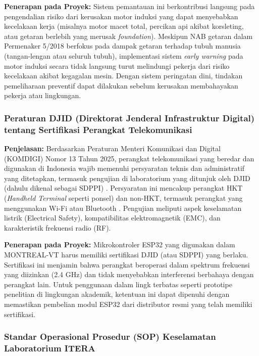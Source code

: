 \documentclass{elsinta}
\begin{document}
\textbf{Penerapan pada Proyek:} Sistem pemantauan ini berkontribusi langsung pada pengendalian risiko dari kerusakan motor induksi yang dapat menyebabkan kecelakaan kerja (misalnya motor macet total, percikan api akibat korsleting, atau getaran berlebih yang merusak \textit{foundation}). Meskipun NAB getaran dalam Permenaker 5/2018 berfokus pada dampak getaran terhadap tubuh manusia (tangan-lengan atau seluruh tubuh), implementasi sistem \textit{early warning} pada motor induksi secara tidak langsung turut melindungi pekerja dari risiko kecelakaan akibat kegagalan mesin. Dengan sistem peringatan dini, tindakan pemeliharaan preventif dapat dilakukan sebelum kerusakan membahayakan pekerja atau lingkungan.

\subsubsection{Peraturan DJID (Direktorat Jenderal Infrastruktur Digital) tentang Sertifikasi Perangkat Telekomunikasi}

\textbf{Penjelasan:} Berdasarkan Peraturan Menteri Komunikasi dan Digital (KOMDIGI) Nomor 13 Tahun 2025, perangkat telekomunikasi yang beredar dan digunakan di Indonesia wajib memenuhi persyaratan teknis dan administratif yang ditetapkan, termasuk pengujian di laboratorium yang ditunjuk oleh DJID (dahulu dikenal sebagai SDPPI) \cite{sdppi_2025}. Persyaratan ini mencakup perangkat HKT (\textit{Handheld Terminal} seperti ponsel) dan non-HKT, termasuk perangkat yang menggunakan Wi-Fi atau Bluetooth \cite{sdppi_2025}. Pengujian meliputi aspek keselamatan listrik (Electrical Safety), kompatibilitas elektromagnetik (EMC), dan karakteristik frekuensi radio (RF).

\textbf{Penerapan pada Proyek:} Mikrokontroler ESP32 yang digunakan dalam MONTREAL-VT harus memiliki sertifikasi DJID (atau SDPPI) yang berlaku. Sertifikasi ini menjamin bahwa perangkat beroperasi dalam spektrum frekuensi yang diizinkan (2.4 GHz) dan tidak menyebabkan interferensi berbahaya dengan perangkat lain. Untuk penggunaan dalam lingk terbatas seperti prototipe penelitian di lingkungan akademik, ketentuan ini dapat dipenuhi dengan memastikan pembelian modul ESP32 dari distributor resmi yang telah memiliki sertifikasi.

\subsubsection{Standar Operasional Prosedur (SOP) Keselamatan Laboratorium ITERA}
\end{document}
